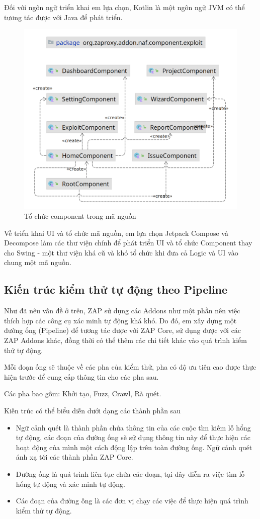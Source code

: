 \documentclass[./../main.tex]{subfiles}
\begin{document}
Đối với ngôn ngữ triển khai em lựa chọn, Kotlin là một ngôn ngữ JVM có thể tương tác được với Java để phát triển.

\begin{figure}[H]
	\includegraphics[width=\linewidth]{./images/package.png}
	\caption{Tổ chức component trong mã nguồn}
	\label{fig:package}
\end{figure}

Về triển khai UI và tổ chức mã nguồn, em lựa chọn Jetpack Compose và Decompose làm các thư viện chính để phát triển UI và tổ chức Component thay cho Swing - một thư viện khá cũ và khó tổ chức khi đưa cả Logic và UI vào chung một mã nguồn.

\subsection{Kiến trúc kiểm thử tự động theo Pipeline}
Như đã nêu vấn đề ở trên, ZAP sử dụng các Addons như một phần nên việc thích hợp các công cụ xác minh tự động khá khó. Do đó, em xây dựng một đường ống (Pipeline) để tương tác được với ZAP Core, sử dụng được với các ZAP Addons khác, đồng thời có thể thêm các chi tiết khác vào quá trình kiểm thử tự động.

Mỗi đoạn ống sẽ thuộc về các pha của kiểm thử, pha có độ ưu tiên cao được thực hiện trước để cung cấp thông tin cho các pha sau.

Các pha bao gồm: Khởi tạo, Fuzz, Crawl, Rà quét.

Kiến trúc có thể biểu diễn dưới dạng các thành phần sau
\begin{itemize}
	\item Ngữ cảnh quét là thành phần chứa thông tin của các cuộc tìm kiếm lỗ hổng tự động, các đoạn của đường ống sẽ sử dụng thông tin này để thực hiện các hoạt động của mình một cách động lập trên toàn đường ống. Ngữ cảnh quét ánh xạ tới các thành phần ZAP Core.
	\item Đường ống là quá trình liên tục chứa các đoạn, tại đây diễn ra việc tìm lỗ hổng tự động và xác minh tự động.
	\item Các đoạn của đường ống là các đơn vị chạy các việc để thực hiện quá trình kiểm thử tự động.
\end{itemize}
\end{document}
